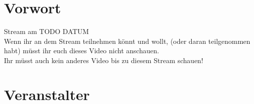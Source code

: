 

\usepackage{listings}
\usepackage{tikz}



\subtitle{Organisatorisches}
\maketitle

\section{Vorwort}
\begin{frame}
	\slidehead
	\begin{center}
		\vspace{1cm}
		{\Huge Stream am TODO DATUM}\\
		\vspace{1cm}
		Wenn ihr an dem Stream teilnehmen könnt und wollt, (oder daran teilgenommen habt) müsst ihr euch dieses Video nicht anschauen.\\
		Ihr müsst auch kein anderes Video bis zu diesem Stream schauen!
	\end{center}
\end{frame}

\section{Veranstalter}
